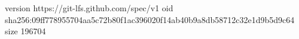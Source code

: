 version https://git-lfs.github.com/spec/v1
oid sha256:09ff778955704aa5c72b80f1ac396020f14ab40b9a8db58712c32e1d9b5d9c64
size 196704
